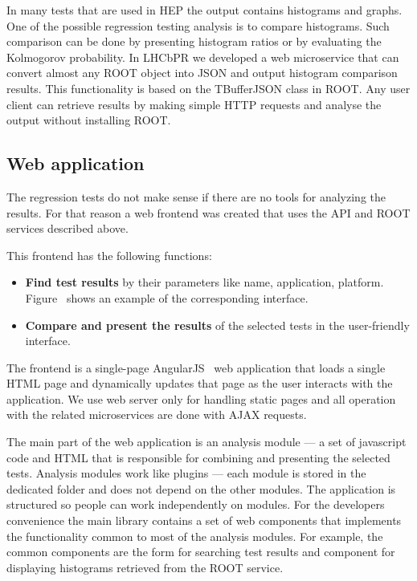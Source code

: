 \documentclass[a4paper]{jpconf}
\begin{document}
In many tests that are used in HEP the output contains histograms and graphs.
One of the possible regression testing analysis is to compare histograms. Such
comparison can be done by presenting histogram ratios or by evaluating the
Kolmogorov probability. In LHCbPR we developed a web microservice that can
convert almost any ROOT object into JSON and output histogram comparison
results. This functionality is based on the TBufferJSON class in ROOT. Any user
client can retrieve results by making simple HTTP requests and analyse the
output without installing ROOT.


\subsection{Web application}\label{sec:webapp}

The regression tests do not make sense if there are no tools for analyzing the
results. For that reason a web frontend was created  that uses the API and
ROOT services described above.

This frontend has the following functions:
\begin{itemize}
\item \textbf{Find test results} by their parameters like name, application,
platform. Figure~ shows an example of the corresponding
interface.
\item \textbf{Compare and present the results} of the selected tests in the user-friendly interface.
\end{itemize}

The frontend is a single-page AngularJS~\cite{angular} web application that
loads a single HTML page and dynamically updates that page as the user interacts
with the application. We use web server only for handling static pages and all
operation with the related microservices are done with AJAX requests.

The main part of the web application is an analysis module --- a set of
javascript code and HTML that is responsible for combining and presenting the
selected tests. Analysis modules work like plugins --- each module is stored in
the dedicated folder and does not depend on the other modules. The application is
structured so people can work independently on modules. For the developers
convenience the main library contains a set of web components that implements
the functionality common to most of the analysis modules. For example, the
common components are the form for searching test results and component for
displaying histograms retrieved from the ROOT service.
\end{document}
